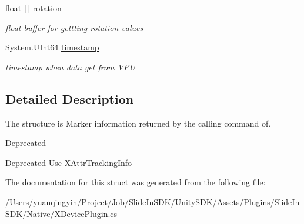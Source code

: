 \begin{DoxyCompactItemize}
float \mbox{[}$\,$\mbox{]} \mbox{\hyperlink{struct_ximmerse_1_1_input_system_1_1_x_device_plugin_1_1_act_param___marker_info_a25b6e2286a0dc69f8b8d89bac3c18daa}{rotation}}
\begin{DoxyCompactList}\small\item\em float buffer for gettting rotation values \end{DoxyCompactList}\item 
\mbox{\label{struct_ximmerse_1_1_input_system_1_1_x_device_plugin_1_1_act_param___marker_info_a39abdb3e2e5746b74981c0ba22bc72d6}} 
System.\+U\+Int64 \mbox{\hyperlink{struct_ximmerse_1_1_input_system_1_1_x_device_plugin_1_1_act_param___marker_info_a39abdb3e2e5746b74981c0ba22bc72d6}{timestamp}}
\begin{DoxyCompactList}\small\item\em timestamp when data get from V\+PU \end{DoxyCompactList}\end{DoxyCompactItemize}


\subsection{Detailed Description}
The structure is Marker information returned by the calling command of. 

\begin{DoxyRefDesc}{Deprecated}
\item[\mbox{\hyperlink{deprecated__deprecated000003}{Deprecated}}]Use \mbox{\hyperlink{struct_ximmerse_1_1_input_system_1_1_x_device_plugin_1_1_x_attr_tracking_info}{X\+Attr\+Tracking\+Info}} \end{DoxyRefDesc}


The documentation for this struct was generated from the following file\+:\begin{DoxyCompactItemize}
\item 
/\+Users/yuanqingyin/\+Project/\+Job/\+Slide\+In\+S\+D\+K/\+Unity\+S\+D\+K/\+Assets/\+Plugins/\+Slide\+In\+S\+D\+K/\+Native/X\+Device\+Plugin.\+cs\end{DoxyCompactItemize}

